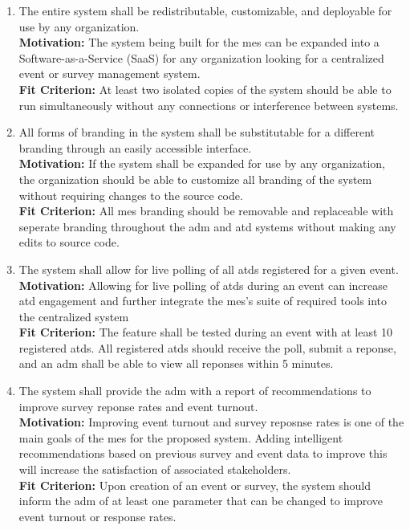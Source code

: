 \documentclass[12pt]{article}
\begin{document}
\begin{enumerate}[align=left,
  leftmargin=*,
  labelsep=1em,
  itemindent=0em,
  label=\bfseries WR-\arabic*:,
  ref=\bfseries WR-\arabic*]
  \item \label{WR1} The entire system shall be redistributable, customizable, and deployable for use by any organization. \\[2mm]
    {\bf Motivation:} The system being built for the \gls{mes} can be expanded into a Software-as-a-Service (SaaS) for any organization looking for a centralized event or survey management system. \\
    {\bf Fit Criterion:} At least two isolated copies of the system should be able to run simultaneously without any connections or interference between systems.
  
  \item \label{WR2} All forms of branding in the system shall be substitutable for a different branding through an easily accessible interface.\\[2mm]
  {\bf Motivation:} If the system shall be expanded for use by any organization, the organization should be able to customize all branding of the system without requiring changes to the source code.\\
  {\bf Fit Criterion:} All \gls{mes} branding should be removable and replaceable with seperate branding throughout the \gls{adm} and \gls{atd} systems without making any edits to source code.

  \item \label{WR3} The system shall allow for live polling of all \glspl{atd} registered for a given event. \\[2mm]
  {\bf Motivation:} Allowing for live polling of \glspl{atd} during an event can increase \gls{atd} engagement and further integrate the \gls{mes}'s suite of required tools into the centralized system\\
  {\bf Fit Criterion:} The feature shall be tested during an event with at least 10 registered \glspl{atd}. All registered \glspl{atd} should receive the poll, submit a reponse, and an \gls{adm} shall be able to view all reponses within 5 minutes.

  \item \label{WR4} The system shall provide the \gls{adm} with a report of recommendations to improve survey reponse rates and event turnout.\\[2mm]
  {\bf Motivation:} Improving event turnout and survey reposnse rates is one of the main goals of the \gls{mes} for the proposed system. Adding intelligent recommendations based on previous survey and event data to improve this will increase the satisfaction of associated stakeholders.\\
  {\bf Fit Criterion:} Upon creation of an event or survey, the system should inform the \gls{adm} of at least one parameter that can be changed to improve event turnout or response rates.


\end{enumerate}
\end{document}
